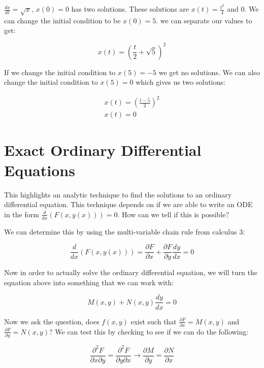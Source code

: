   \begin{problem}
    $\frac{dx}{dt}=\sqrt{x}$, $x(0)=0$ has two solutions. These solutions are $x(t)=\frac{t^2}{4}$ and $0$. We can change the initial condition to be $x(0)=5$. we can separate our values to get:

    \begin{equation}
      x(t) =\left(\frac{t}{2} + \sqrt{5}\right)^2
    \end{equation}
    
    If we change the initial condition to $x(5)=-5$ we get no solutions. We can also change the initial condition to $x(5)=0$ which gives us two solutions:

    \begin{align}
      x(t) =\left(\frac{t - 5}{2}\right)^2\\
      x(t) = 0
    \end{align}
  \end{problem}

\section{Exact Ordinary Differential Equations}

  This highlights an analytic technique to find the solutions to an ordinary differential equation. This technique depends on if we are able to write an ODE in the form $\frac{d}{dx}(F(x,y(x)))=0$. How can we tell if this is possible? 

    We can determine this by using the multi-variable chain rule from calculus 3:

    \begin{equation}
      \frac{d}{dx}(F(x,y(x))) = \frac{\partial F}{\partial x} + \frac{\partial F}{\partial y} \frac{dy}{dx} = 0 
    \end{equation}

    Now in order to actually solve the ordinary differential equation, we will turn the equation above into something that we can work with:

    \begin{equation}
      M(x,y) + N(x,y)\frac{dy}{dx} = 0
    \end{equation}

    Now we ask the question, does $f(x,y)$ exist such that $\frac{\partial F}{\partial x} =  M(x,y)$ and $\frac{\partial F}{\partial y} = N(x,y)$? We can test this by checking to see if we can do the following:

    \begin{equation}
      \frac{\partial^2F}{\partial x\partial y}=\frac{\partial^2 F}{\partial y\partial x}\rightarrow\boxed{\frac{\partial M}{\partial y}=\frac{\partial N}{\partial x}}
    \end{equation}

